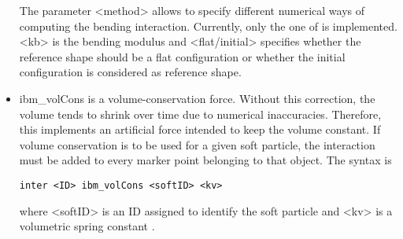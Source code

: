 \begin{itemize}
The parameter <method> allows to specify different numerical ways of computing the bending interaction. Currently, only the one of  is implemented. <kb> is the bending modulus and <flat/initial> specifies whether the reference shape should be a flat configuration or whether the initial configuration is considered as reference shape.

\item ibm_volCons is a volume-conservation force. Without this correction, the volume tends to shrink over time due to numerical inaccuracies. Therefore, this implements an artificial force intended to keep the volume constant. If volume conservation is to be used for a given soft particle, the interaction must be added to every marker point belonging to that object. The syntax is
\begin{verbatim}
inter <ID> ibm_volCons <softID> <kv>
\end{verbatim}
where <softID> is an ID assigned to identify the soft particle and <kv> is a volumetric spring constant  .
\end{itemize}



